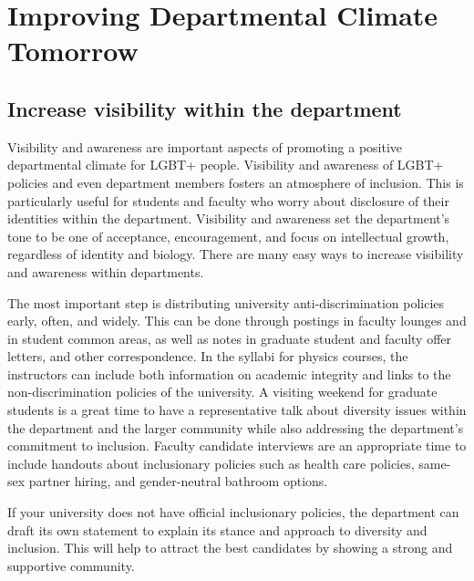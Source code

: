 %

\chapter{Improving Departmental Climate Tomorrow}	%
\label{climate-tomorrow}		%
\normalsize			%

\section {Increase visibility within the department}
\label{visibility}
Visibility and awareness are important aspects of promoting a positive departmental climate for LGBT+ people. Visibility and awareness of LGBT+ policies and even department members fosters an atmosphere of inclusion. This is particularly useful for students and faculty who worry about disclosure of their identities within the department. Visibility and awareness set the department's tone to be one of acceptance, encouragement, and focus on intellectual growth, regardless of identity and biology. There are many easy ways to increase visibility and awareness within departments.

The most important step is distributing university anti-discrimination policies early, often, and widely. This can be done through postings in faculty lounges and in student common areas, as well as notes in graduate student and faculty offer letters, and other correspondence. In the syllabi for physics courses, the instructors can include both information on academic integrity and links to the non-discrimination policies of the university. A visiting weekend for graduate students is a great time to have a representative talk about diversity issues within the department and the larger community while also addressing the department's commitment to inclusion. Faculty candidate interviews are an appropriate time to include handouts about inclusionary policies such as health care policies, same-sex partner hiring, and gender-neutral bathroom options.

If your university does not have official inclusionary policies, the department can draft its own statement to explain its stance and approach to diversity and inclusion. This will help to attract the best candidates by showing a strong and supportive community.



